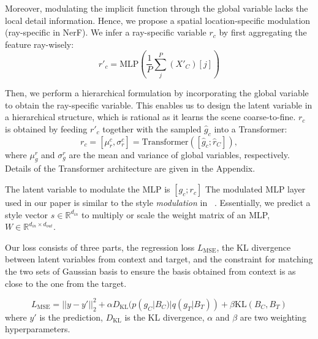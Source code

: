  Moreover, modulating the implicit function through the global variable lacks the local detail information. Hence, we propose a spatial location-specific modulation (ray-specific in NerF). We infer a ray-specific variable $r_c$ by first aggregating the feature ray-wisely:
\begin{equation}
    r'_c = \text{MLP}(\frac{1}{ P}\sum_j^{P}(X'_C)[j])
\end{equation}


Then, we perform a hierarchical formulation by incorporating the global variable to obtain the ray-specific variable. This enables us to design the latent variable in a hierarchical structure, which is rational as it learns the scene coarse-to-fine. $r_c$ is obtained by feeding $r'_c$ together with the sampled $\hat{g}_c$ into a Transformer: 
\begin{equation}
    r_c = [\mu^c_r, \sigma^c_r] = \text{Transformer}([\hat{g}_c; \hat{r}_C]),
\end{equation}
where $\mu^r_g$ and $\sigma^r_g$ are the mean and variance of global variables, respectively. Details of the Transformer architecture are given in the Appendix. 


 The latent variable to modulate the MLP is $[g_c;r_c]$
The modulated MLP layer used in our paper is similar to the style \textit{modulation} in ~\cite{guo2023versatile}. Essentially, we predict a style vector $s\in \mathbb{R}^{d_{in}}$ to multiply or scale the weight matrix of an MLP, $W \in \mathbb{R}^{d_{in} \times d_{out}}$.




 Our loss consists of three parts, the regression loss $L_{\text{MSE}}$, the KL divergence between latent variables from context and target, and the constraint for matching the two sets of Gaussian basis to ensure the basis obtained from context is as close to the one from the target. 

\begin{equation}
    L_{\text{MSE}} = ||y - y'||^2_2 + \alpha D_{\text{KL}}(p(g_C|B_C)|q(g_T|B_T)) + \beta \text{KL}(B_C, B_T)
\end{equation}
where $y'$ is the prediction, $D_{\text{KL}}$ is the KL divergence, $\alpha$ and $\beta$ are two weighting hyperparameters. 

